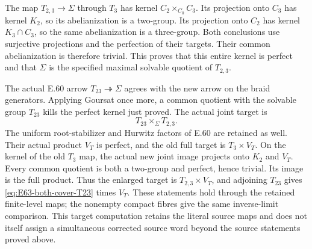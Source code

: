 The map $T_{2,3}\to\Sigma$ through $T_3$ has kernel
$C_2\times_{C_0}C_3$. Its projection onto $C_3$ has kernel
$K_2$, so its abelianization is a two-group. Its projection
onto $C_2$ has kernel $K_3\cap C_3$, so the same abelianization
is a three-group. Both conclusions use surjective projections
and the perfection of their targets. Their common abelianization
is therefore trivial. This proves that this entire kernel is
perfect and that $\Sigma$ is the specified maximal solvable
quotient of $T_{2,3}$.

The actual E.60 arrow $T_{23}\twoheadrightarrow\Sigma$ agrees
with the new arrow on the braid generators. Applying Goursat
once more, a common quotient with the solvable group $T_{23}$
kills the perfect kernel just proved. The actual joint target is
\begin{equation}
             T_{23}\times_{\Sigma}T_{2,3}.
 \tag{E.63.38}\label{eq:E63-both-cover-T23}
\end{equation}
The uniform root-stabilizer and Hurwitz factors of E.60 are
retained as well. Their actual product $V_T$ is perfect, and
the old full target is $T_3\times V_T$. On the kernel of the
old $T_3$ map, the actual new joint image projects onto $K_2$
and $V_T$. Every common quotient is both a two-group and
perfect, hence trivial. Its image is the full product.
Thus the enlarged target is $T_{2,3}\times V_T$, and adjoining
$T_{23}$ gives \eqref{eq:E63-both-cover-T23} times $V_T$.
These statements hold through the retained finite-level maps;
the nonempty compact fibres give the same inverse-limit
comparison. This target computation retains the literal source
maps and does not itself assign a simultaneous corrected
source word beyond the source statements proved above.
